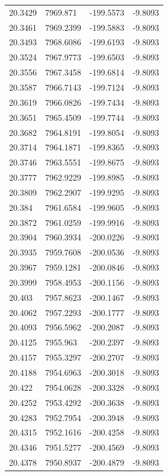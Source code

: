 \begin{table}[H]
\begin{tabular}{llll}
20.3429 & 7969.871 & -199.5573 & -9.8093 \\
20.3461 & 7969.2399 & -199.5883 & -9.8093 \\
20.3493 & 7968.6086 & -199.6193 & -9.8093 \\
20.3524 & 7967.9773 & -199.6503 & -9.8093 \\
20.3556 & 7967.3458 & -199.6814 & -9.8093 \\
20.3587 & 7966.7143 & -199.7124 & -9.8093 \\
20.3619 & 7966.0826 & -199.7434 & -9.8093 \\
20.3651 & 7965.4509 & -199.7744 & -9.8093 \\
20.3682 & 7964.8191 & -199.8054 & -9.8093 \\
20.3714 & 7964.1871 & -199.8365 & -9.8093 \\
20.3746 & 7963.5551 & -199.8675 & -9.8093 \\
20.3777 & 7962.9229 & -199.8985 & -9.8093 \\
20.3809 & 7962.2907 & -199.9295 & -9.8093 \\
20.384 & 7961.6584 & -199.9605 & -9.8093 \\
20.3872 & 7961.0259 & -199.9916 & -9.8093 \\
20.3904 & 7960.3934 & -200.0226 & -9.8093 \\
20.3935 & 7959.7608 & -200.0536 & -9.8093 \\
20.3967 & 7959.1281 & -200.0846 & -9.8093 \\
20.3999 & 7958.4953 & -200.1156 & -9.8093 \\
20.403 & 7957.8623 & -200.1467 & -9.8093 \\
20.4062 & 7957.2293 & -200.1777 & -9.8093 \\
20.4093 & 7956.5962 & -200.2087 & -9.8093 \\
20.4125 & 7955.963 & -200.2397 & -9.8093 \\
20.4157 & 7955.3297 & -200.2707 & -9.8093 \\
20.4188 & 7954.6963 & -200.3018 & -9.8093 \\
20.422 & 7954.0628 & -200.3328 & -9.8093 \\
20.4252 & 7953.4292 & -200.3638 & -9.8093 \\
20.4283 & 7952.7954 & -200.3948 & -9.8093 \\
20.4315 & 7952.1616 & -200.4258 & -9.8093 \\
20.4346 & 7951.5277 & -200.4569 & -9.8093 \\
20.4378 & 7950.8937 & -200.4879 & -9.8093 \\

\end{tabular}
\end{table}
